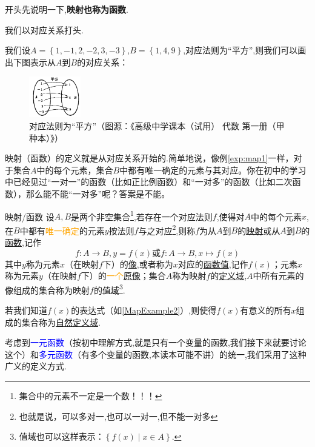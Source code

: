 \documentclass[lang=cn,math=cm,chinesefont=nofont,11pt,scheme=chinese,twocol]{elegantbook}
\begin{document}
开头先说明一下,\textbf{映射也称为函数}.

我们以对应关系打头.

\begin{example}\label{exp:map1}
  我们设$A=\left\{1,-1,2,-2,3,-3\right\}$,$B=\left\{1,4,9\right\}$,对应法则为“平方”,则我们可以画出下图表示从$A$到$B$的对应关系：
\end{example}

\begin{figure}[h]
  \centering
  \includegraphics[width=0.2\textwidth]{image/map2.1.1.png}
  \caption{对应法则为“平方”（图源：《高级中学课本（试用） 代数 第一册（甲种本）》）}
  \label{img:map1}
\end{figure}

映射（函数）的定义就是从对应关系开始的.简单地说，像例\ref{exp:map1}一样，对于集合$A$中的每个元素，集合$B$中都有唯一确定的元素与其对应。你在初中的学习中已经见过“一对一”的函数（比如正比例函数）和“一对多”的函数（比如二次函数），那么能不能“一对多”呢？答案是不能。

\begin{definition}{映射/函数}\label{def:map}
  设$A,B$是两个非空集合\footnote{集合中的元素不一定是一个数！！！},若存在一个对应法则$f$,使得对$A$中的每个元素$x$,在$B$中都有\textcolor{orange}{唯一确定}的元素$y$按法则$f$与之对应\footnote{也就是说，可以多对一,也可以一对一,但不能一对多},则称$f$为从$A$到$B$的\underline{映射}或从$A$到$B$的\underline{函数},记作$$f:A\rightarrow B,y=f(x)\text{或}f:A\rightarrow B,x\mapsto f(x)$$其中$y$称为元素$x$（在映射$f$下）的\underline{像},或者称为$x$对应的\underline{函数值},记作$f(x)$；元素$x$称为元素$y$（在映射$f$下）的\textcolor{orange}{一个}\underline{原像}；集合$A$称为映射$f$的\underline{定义域},$A$中所有元素的像组成的集合称为映射$f$的\underline{值域}\footnote{值域也可以这样表示：$\left\{f(x)\mid x\in A\right\}.$}.

  若我们知道$f(x)$的表达式（如\ref{MapExample2}）,则使得$f(x)$有意义的所有$x$组成的集合称为\underline{自然定义域}.
\end{definition}

考虑到\textcolor{blue}{一元函数}（按初中理解方式,就是只有一个变量的函数,我们接下来就要讨论这个）和\textcolor{blue}{多元函数}（有多个变量的函数,本读本可能不讲）的统一,我们采用了这种广义的定义方式.
\end{document}
